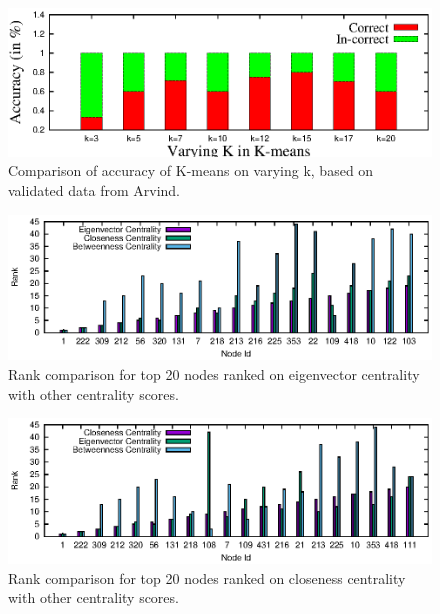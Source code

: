 \begin{figure}[ht]
    \centering
    \includegraphics[width=1\textwidth]{figures/social-result_arvind_kmeans.eps}
    \caption{Comparison of accuracy of K-means on varying k, based on validated data from Arvind.}
    \label{fig:social-result-arvind-kmeans}
\end{figure}

\begin{figure}[ht]
    \centering
    \includegraphics[width=1\textwidth]{figures/social-result_eigen.eps}
    \caption{Rank comparison for top 20 nodes ranked on eigenvector centrality with other centrality scores.}
    \label{fig:social-result-eigen}
\end{figure}

\begin{figure}[ht]
    \centering
    \includegraphics[width=1\textwidth]{figures/social-result_closeness.eps}
    \caption{Rank comparison for top 20 nodes ranked on closeness centrality with other centrality scores.}
    \label{fig:social-result-closeness}
\end{figure}

